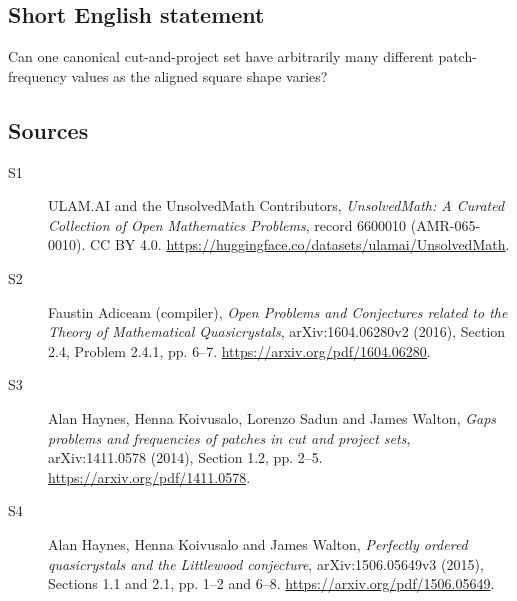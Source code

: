 \documentclass[11pt]{article}
\begin{document}
\subsection{Short English statement}
Can one canonical cut-and-project set have arbitrarily many different patch-frequency values as the aligned square shape varies?
\subsection{Sources}
\begin{description}
\item[\hypertarget{source:6600010:1}{S1}] ULAM.AI and the UnsolvedMath Contributors, \emph{UnsolvedMath: A Curated Collection of Open Mathematics Problems}, record 6600010 (AMR-065-0010). CC BY 4.0. \url{https://huggingface.co/datasets/ulamai/UnsolvedMath}.
\item[\hypertarget{source:6600010:2}{S2}] Faustin Adiceam (compiler), \emph{Open Problems and Conjectures related to the Theory of Mathematical Quasicrystals}, arXiv:1604.06280v2 (2016), Section 2.4, Problem 2.4.1, pp. 6--7. \url{https://arxiv.org/pdf/1604.06280}.
\item[\hypertarget{source:6600010:3}{S3}] Alan Haynes, Henna Koivusalo, Lorenzo Sadun and James Walton, \emph{Gaps problems and frequencies of patches in cut and project sets}, arXiv:1411.0578 (2014), Section 1.2, pp. 2--5. \url{https://arxiv.org/pdf/1411.0578}.
\item[\hypertarget{source:6600010:4}{S4}] Alan Haynes, Henna Koivusalo and James Walton, \emph{Perfectly ordered quasicrystals and the Littlewood conjecture}, arXiv:1506.05649v3 (2015), Sections 1.1 and 2.1, pp. 1--2 and 6--8. \url{https://arxiv.org/pdf/1506.05649}.
\end{description}
\label{end:6600010}
\end{document}
